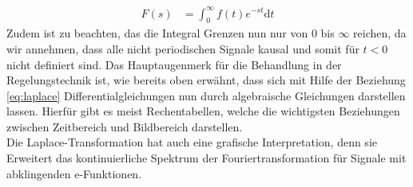 %
\begin{equation}
\begin{aligned}
F(s)&=\int_{0}^{\infty}f(t)e^{-st}\text{d}t\label{eq:laplace}
\end{aligned}
\end{equation}
%
Zudem ist zu beachten, das die Integral Grenzen nun nur von $0$ bis $\infty$ reichen, da wir annehmen, dass alle nicht periodischen Signale kausal und somit für $t<0$ nicht definiert sind. Das Hauptaugenmerk für die Behandlung in der Regelungstechnik ist, wie bereits oben erwähnt, dass sich mit Hilfe der Beziehung \eqref{eq:laplace} Differentialgleichungen nun durch algebraische Gleichungen darstellen lassen. Hierfür gibt es meist Rechentabellen, welche die wichtigsten Beziehungen zwischen Zeitbereich und Bildbereich darstellen.\\
%
Die Laplace-Transformation hat auch eine grafische Interpretation, denn sie Erweitert das kontinuierliche Spektrum der Fouriertransformation für Signale mit abklingenden e-Funktionen. 
%
